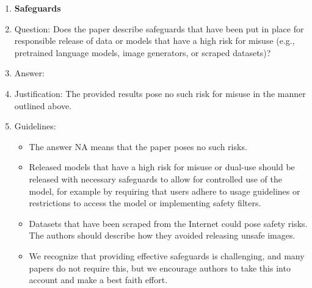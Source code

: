 \documentclass{article}
\theoremstyle{plain}
\theoremstyle{definition}
\theoremstyle{remark}
\begin{document}
\begin{enumerate}
\item {\bf Safeguards}
    \item[] Question: Does the paper describe safeguards that have been put in place for responsible release of data or models that have a high risk for misuse (e.g., pretrained language models, image generators, or scraped datasets)?
    \item[] Answer: \answerNA{} %
    \item[] Justification: The provided results pose no such risk for misuse in the manner outlined above.
    \item[] Guidelines:
    \begin{itemize}
        \item The answer NA means that the paper poses no such risks.
        \item Released models that have a high risk for misuse or dual-use should be released with necessary safeguards to allow for controlled use of the model, for example by requiring that users adhere to usage guidelines or restrictions to access the model or implementing safety filters. 
        \item Datasets that have been scraped from the Internet could pose safety risks. The authors should describe how they avoided releasing unsafe images.
        \item We recognize that providing effective safeguards is challenging, and many papers do not require this, but we encourage authors to take this into account and make a best faith effort.
    \end{itemize}


\end{enumerate}
\end{document}
